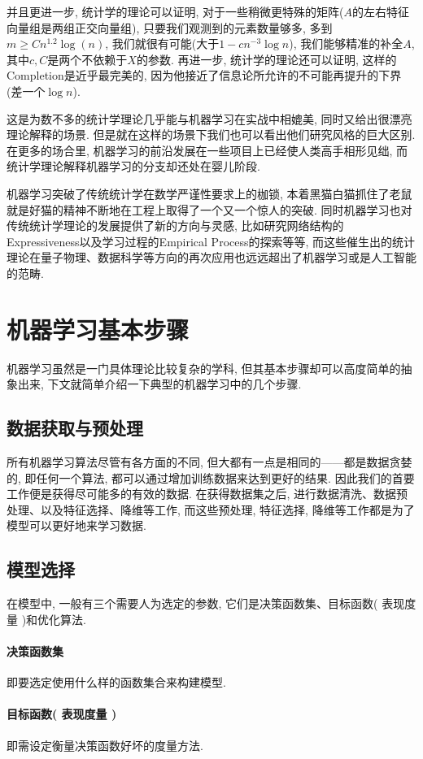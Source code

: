 \documentclass[lang=cn,11pt,a4paper]{elegantpaper}
\begin{document}
 \par 并且更进一步, 统计学的理论可以证明, 对于一些稍微更特殊的矩阵($A$的左右特征向量组是两组正交向量组), 只要我们观测到的元素数量够多, 多到$m\geq C n^{1.2} \log(n)$, 我们就很有可能(大于$1-cn^{-3}\log n$), 我们能够精准的补全$A$, 其中$c,C$是两个不依赖于$X$的参数\cite{Candes2009}. 再进一步, 统计学的理论还可以证明, 这样的Completion是近乎最完美的, 因为他接近了信息论所允许的不可能再提升的下界(差一个$\log n$)\cite{Candes2010}.
\par 这是为数不多的统计学理论几乎能与机器学习在实战中相媲美, 同时又给出很漂亮理论解释的场景. 但是就在这样的场景下我们也可以看出他们研究风格的巨大区别. 在更多的场合里, 机器学习的前沿发展在一些项目上已经使人类高手相形见绌, 而统计学理论解释机器学习的分支却还处在婴儿阶段. 
\par 机器学习突破了传统统计学在数学严谨性要求上的枷锁, 本着黑猫白猫抓住了老鼠就是好猫的精神不断地在工程上取得了一个又一个惊人的突破. 同时机器学习也对传统统计学理论的发展提供了新的方向与灵感, 比如研究网络结构的Expressiveness\cite{Yarotsky2017}以及学习过程的Empirical Process\cite{Vapnik1994}的探索等等, 而这些催生出的统计理论在量子物理、数据科学等方向的再次应用也远远超出了机器学习或是人工智能的范畴.
\section{机器学习基本步骤}
机器学习虽然是一门具体理论比较复杂的学科, 但其基本步骤却可以高度简单的抽象出来, 下文就简单介绍一下典型的机器学习中的几个步骤.
\subsection{数据获取与预处理}
所有机器学习算法尽管有各方面的不同, 但大都有一点是相同的——都是数据贪婪的, 即任何一个算法, 都可以通过增加训练数据来达到更好的结果. 因此我们的首要工作便是获得尽可能多的有效的数据. 在获得数据集之后, 进行数据清洗、数据预处理、以及特征选择、降维等工作, 而这些预处理, 特征选择, 降维等工作都是为了模型可以更好地来学习数据.
\subsection{模型选择}
在模型中, 一般有三个需要人为选定的参数, 它们是决策函数集、目标函数( 表现度量 )和优化算法.
\paragraph{决策函数集}即要选定使用什么样的函数集合来构建模型.
\paragraph{目标函数( 表现度量 )}即需设定衡量决策函数好坏的度量方法.
\end{document}
